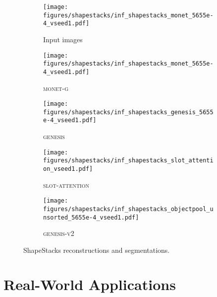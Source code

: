 \documentclass{article}
\begin{document}
\begin{figure}[h!]
	\centering
	\begin{subfigure}{\linewidth}
		\texttt{[image: figures/shapestacks/inf\_shapestacks\_monet\_5655e-4\_vseed1.pdf]}
		\caption{Input images}
		\vspace{6pt}
	\end{subfigure}
	\begin{subfigure}{\linewidth}
		\texttt{[image: figures/shapestacks/inf\_shapestacks\_monet\_5655e-4\_vseed1.pdf]}
		\caption{\textsc{monet-g}}
		\vspace{6pt}
	\end{subfigure}
	\begin{subfigure}{\linewidth}
		\texttt{[image: figures/shapestacks/inf\_shapestacks\_genesis\_5655e-4\_vseed1.pdf]}
		\caption{\textsc{genesis}}
		\vspace{6pt}
	\end{subfigure}
	\begin{subfigure}{\linewidth}
		\texttt{[image: figures/shapestacks/inf\_shapestacks\_slot\_attention\_vseed1.pdf]}
		\caption{\textsc{slot-attention}}
		\vspace{6pt}
	\end{subfigure}
	\begin{subfigure}{\linewidth}
		\texttt{[image: figures/shapestacks/inf\_shapestacks\_objectpool\_unsorted\_5655e-4\_vseed1.pdf]}
		\caption{\textsc{genesis-v2}}
	\end{subfigure}
	\caption{ShapeStacks reconstructions and segmentations.}
\end{figure}

\clearpage


\section{Real-World Applications}
\label{app:realworld}
\end{document}
